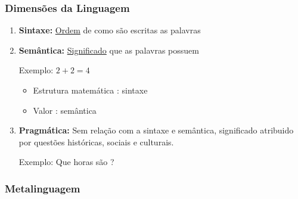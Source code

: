         \subsubsection*{Dimensões da Linguagem}
           
            \begin{enumerate}[left=0.5cm, align=left, nosep]
                \item \textbf{Sintaxe:} \underline{Ordem} de como são escritas as palavras
                \item \textbf{Semântica:} \underline{Significado} que as palavras possuem
                
                Exemplo: $2 + 2 = 4$
                \begin{itemize}[left=0.5cm, nosep, label=$\hookrightarrow$]
                    \item Estrutura matemática : sintaxe 
                    \item Valor : semântica
                \end{itemize}

                \item \textbf{Pragmática:} Sem relação com a sintaxe e semântica, significado atribuido por 
                questões históricas, sociais e culturais.
                
                Exemplo: Que horas são ?
            
            \end{enumerate}

        \subsubsection*{Metalinguagem}
            
